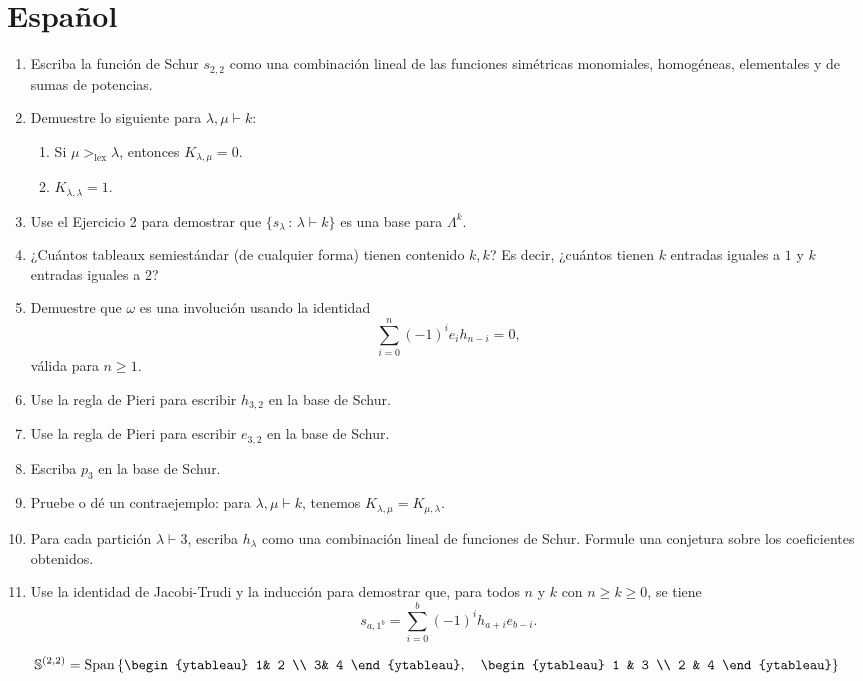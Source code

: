 \documentclass{article}
\begin{document}
\section*{Español}
\begin{enumerate}
\item Escriba la función de Schur $s_{2,2}$ como una combinación lineal de las funciones simétricas monomiales, homogéneas, elementales y de sumas de potencias.
\item Demuestre lo siguiente para $\lambda,\mu \vdash k$:
\begin{enumerate}
\item Si $\mu>_{\text{lex}} \lambda$, entonces $K_{\lambda, \mu} =0$.
\item $K_{\lambda,\lambda} = 1$.
\end{enumerate}
\item Use el Ejercicio 2 para demostrar que $\{s_\lambda\, : \, \lambda\vdash k\}$ es una base para $\Lambda^k$.
\item ¿Cuántos tableaux semiestándar (de cualquier forma) tienen contenido $k,k$? Es decir, ¿cuántos tienen $k$ entradas iguales a $1$ y $k$ entradas iguales a $2$?
\item Demuestre que $\omega$ es una involución usando la identidad \[\sum_{i=0}^n(-1)^i e_ih_{n-i} =0,\] válida para $n\geq 1$.
\item Use la regla de Pieri para escribir $h_{3,2}$ en la base de Schur.
\item Use la regla de Pieri para escribir $e_{3,2}$ en la base de Schur.
\item Escriba $p_3$ en la base de Schur.
\item Pruebe o dé un contraejemplo: para $\lambda, \mu\vdash k$, tenemos $K_{\lambda, \mu}=K_{\mu, \lambda}$.
\item Para cada partición $\lambda \vdash 3$, escriba $h_\lambda$ como una combinación lineal de funciones de Schur. Formule una conjetura sobre los coeficientes obtenidos.
\item Use la identidad de Jacobi-Trudi y la inducción para demostrar que, para todos $n$ y $k$ con $n \geq k\geq 0$, se tiene
\[
s_{a,1^b} = \sum_{i=0}^b (-1)^{i} h_{a+i} e_{b-i}.
\]
\end{enumerate}

$$
\mathbb{S}^{(2,2)}=\text{Span}\left\{ 
\begin{ytableau}
1& 2 \\
3& 4
\end{ytableau}, \quad
\begin{ytableau}
1 & 3 \\
2 & 4
\end{ytableau}
\right\}
$$
\end{document}

